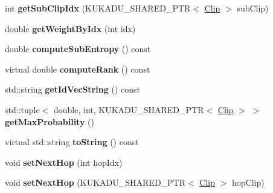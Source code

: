 \begin{DoxyCompactItemize}
\item 
int {\bfseries get\+Sub\+Clip\+Idx} (K\+U\+K\+A\+D\+U\+\_\+\+S\+H\+A\+R\+E\+D\+\_\+\+P\+TR$<$ \hyperlink{classkukadu_1_1Clip}{Clip} $>$ sub\+Clip)\hypertarget{classkukadu_1_1Clip_a47e51b76f2308a7775d9b6ceb92231a5}{}\label{classkukadu_1_1Clip_a47e51b76f2308a7775d9b6ceb92231a5}

\item 
double {\bfseries get\+Weight\+By\+Idx} (int idx)\hypertarget{classkukadu_1_1Clip_ae79760b863e5c56cef78a137243c33f4}{}\label{classkukadu_1_1Clip_ae79760b863e5c56cef78a137243c33f4}

\item 
double {\bfseries compute\+Sub\+Entropy} () const \hypertarget{classkukadu_1_1Clip_a05ab9806e99f04e02b8af71a5130a6bb}{}\label{classkukadu_1_1Clip_a05ab9806e99f04e02b8af71a5130a6bb}

\item 
virtual double {\bfseries compute\+Rank} () const \hypertarget{classkukadu_1_1Clip_ab6d3da091cd55f6e85abf03fa31d4eac}{}\label{classkukadu_1_1Clip_ab6d3da091cd55f6e85abf03fa31d4eac}

\item 
std\+::string {\bfseries get\+Id\+Vec\+String} () const \hypertarget{classkukadu_1_1Clip_a0e794578f3fcb41fd6dd499c22c30565}{}\label{classkukadu_1_1Clip_a0e794578f3fcb41fd6dd499c22c30565}

\item 
std\+::tuple$<$ double, int, K\+U\+K\+A\+D\+U\+\_\+\+S\+H\+A\+R\+E\+D\+\_\+\+P\+TR$<$ \hyperlink{classkukadu_1_1Clip}{Clip} $>$ $>$ {\bfseries get\+Max\+Probability} ()\hypertarget{classkukadu_1_1Clip_a83e6f82762780e30e45a761688aa12de}{}\label{classkukadu_1_1Clip_a83e6f82762780e30e45a761688aa12de}

\item 
virtual std\+::string {\bfseries to\+String} () const \hypertarget{classkukadu_1_1Clip_abf1bb19d4b0094d616f543120dedbd7d}{}\label{classkukadu_1_1Clip_abf1bb19d4b0094d616f543120dedbd7d}

\item 
void {\bfseries set\+Next\+Hop} (int hop\+Idx)\hypertarget{classkukadu_1_1Clip_a6b905b49fbab541a181a6883da7a868a}{}\label{classkukadu_1_1Clip_a6b905b49fbab541a181a6883da7a868a}

\item 
void {\bfseries set\+Next\+Hop} (K\+U\+K\+A\+D\+U\+\_\+\+S\+H\+A\+R\+E\+D\+\_\+\+P\+TR$<$ \hyperlink{classkukadu_1_1Clip}{Clip} $>$ hop\+Clip)\hypertarget{classkukadu_1_1Clip_a0d4f9f3ecb5df4734e3d46a98a237ee7}{}\label{classkukadu_1_1Clip_a0d4f9f3ecb5df4734e3d46a98a237ee7}


\end{DoxyCompactItemize}
